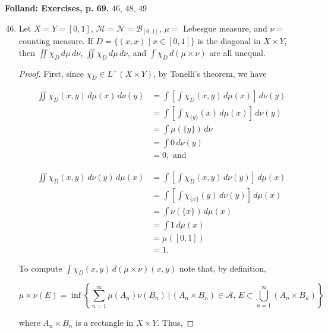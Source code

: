 \documentclass[11pt,oneside,english]{amsart}
\theoremstyle{definition}
\newcommand{\MC}[1]{\mathcal{#1}}
\begin{document}
\rightline{\today}

\vspace{-5mm}
\textbf{Folland: Exercises, p. 69.} 46, 48, 49 



\vspace{5mm}
\begin{enumerate}
\setcounter{enumi}{45}




\item Let $X=Y=[0,1]$, $\MC{M}=\MC{N}=\MC{B}_{[0,1]}$, $\mu=$ Lebesgue measure, and $\nu =$ counting measure. If $D=\{(x,x)\mid x\in[0,1]\}$ is the diagonal in $X\times Y$, then $\iint \chi_D\,d\mu\,d\nu$, $\iint \chi_D\,d\mu\,d\nu$, and $\int \chi_D\,d(\mu\times\nu)$ are all unequal. 

\begin{proof}
First, since $\chi_D\in L^+(X\times Y)$, by Tonelli's theorem, we have

\begin{align*}
\iint\chi_D(x,y)\,d\mu(x) \,d\nu(y)&=\int\left[\int\chi_D(x,y)\,d\mu(x)\right]\,d\nu(y)\\[2mm]
&=\int\left[\int\chi_{\{y\}}(x)\,d\mu(x)\right]\,d\nu(y)\\[2mm]
&=\int\mu(\{y\})\,d\nu\\[2mm]
&=\int 0\,d\nu(y)\\[2mm]
&=0,\text{ and}
\end{align*}

\begin{align*}
\iint\chi_D(x,y)\,d\nu(y)\,d\mu(x) &=\int \left[\int\chi_D(x,y)\,d\nu(y)\right]\,d\mu(x)\\[2mm]
&=\int\left[\int\chi_{\{x\}}(y)\,d\nu(y)\right]\,d\mu(x)\\[2mm]
&=\int\nu(\{x\})\,d\mu(x)\\[2mm]
&=\int1\,d\mu(x)\\[2mm]
&=\mu([0,1])\\[2mm]
&=1.
\end{align*}

To compute $\int \chi_D(x,y)\,d(\mu\times\nu)(x,y)$ note that, by definition,

\[
\mu\times\nu(E)=\inf\left\{\sum_{n=1}^\infty\mu(A_n)\nu(B_n)\,\Big|\,(A_n\times B_n)\in\MC{A},\,E\subset\bigcup_{n=1}^\infty(A_n\times B_n)\right\}
\]

where $A_n\times B_n$ is a rectangle in $X\times Y$. Thus,


\end{proof}
\end{enumerate}
\end{document}
